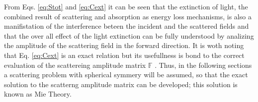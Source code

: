 %
%
\noindent From Eqs. \eqref{eq:Stot} and  \eqref{eq:Cext} it can be seen that the extinction of light, the combined result of scattering and absorption as energy loss mechanisms, is also a manifistation of the interference beteen the incident and the scattered fields and that the over all effect of the light extinction can be fully understood by analizing the  amplitude of the scattering field in the forward direction.  It is woth noting that Eq. \eqref{eq:Cext} is an exact relation but its usefullness is bond to the correct evaluation of the scattereing amplitude matrix $\mathbb{F}$ \cite{tsang_scattering_2000}. Thus, in the following sections a scattering problem with spherical symmery will be assumed, so that the exact solution to the scatterng amplitude matrix can be developed; this solution is known as Mie Theory. 








\clearpage

\begin{figure}
\def\svgwidth{\textwidth} \small
%
\vspace*{-23.75em}
\hspace*{-4.5em}
\begin{subfigure}{.24\textwidth}\caption{ }\label{1}\end{subfigure}
\begin{subfigure}{.24\textwidth}\caption{ }\label{2}\end{subfigure}
\begin{subfigure}{.235\textwidth}\caption{ }\label{3}\end{subfigure}
\begin{subfigure}{.24\textwidth}\caption{ }\label{4}\end{subfigure}
\vspace*{22em}
\caption{   }
\end{figure}

